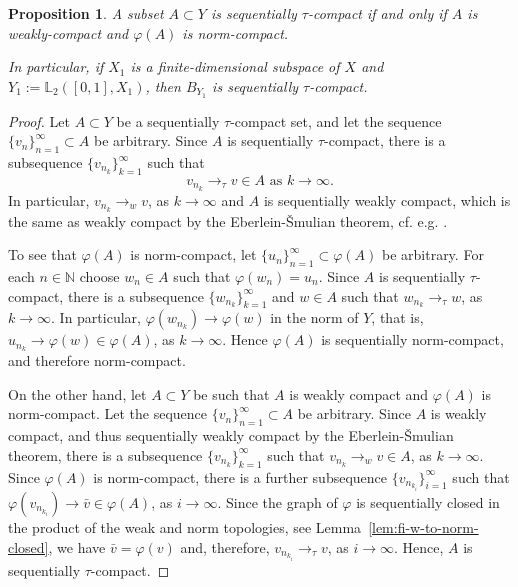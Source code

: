 \documentclass[12pt,leqno]{article}
\newtheorem{prop}[thm]{Proposition}   %
\theoremstyle{definition}
\theoremstyle{remark}
\def\N{\mathbb{N}}
\def\L{\mathbb{L}}
\begin{document}
    \begin{prop}\label{seq-tau-lsc}
        A subset $A\subset Y$ is sequentially $\tau$-compact if and only if $A$ is weakly-compact and $\varphi(A)$ is norm-compact.

        In particular, if $X_1$ is a finite-dimensional subspace of $X$ and
        $
            Y_1 := \L_2([0,1],X_1)$,
               then $B_{Y_1}$ is sequentially $\tau$-compact.
    \end{prop}
    \begin{proof}
        Let $A\subset Y$ be a sequentially $\tau$-compact set, and let the sequence $\{v_n\}_{n=1}^\infty\subset A$ be arbitrary. Since $A$ is sequentially  $\tau$-compact, there is a subsequence $\{v_{n_k}\}_{k=1}^\infty$ such that
        $$
             v_{n_k} \to_\tau v \in A\text{ as }k\to \infty.
        $$
        In particular, $v_{n_k} \to_w v$, as $k\to\infty$ and $A$ is sequentially weakly compact, which is the same as weakly compact by the Eberlein-\v{S}mulian theorem, cf. e.g. \cite[Theorem~3.28]{rudin_functional}.

        To see that $\varphi(A)$ is norm-compact, let $\{u_n\}_{n=1}^\infty \subset \varphi(A)$ be arbitrary. For each $n\in\N$ choose $w_n\in A$ such that $\varphi(w_n)=u_n$. Since $A$ is sequentially $\tau$-compact, there is a subsequence $\{w_{n_k}\}_{k=1}^\infty$ and $w\in A$ such that $w_{n_k}\to_\tau w$, as $k\to\infty$. In particular, $\varphi(w_{n_k}) \to \varphi(w)$ in the norm of $Y$, that is, $u_{n_k}\to \varphi(w)\in \varphi(A)$, as $k\to\infty$. Hence $\varphi(A)$ is sequentially norm-compact, and therefore norm-compact.

        On the other hand, let $A\subset Y$ be such that $A$ is weakly compact and $\varphi(A)$ is norm-compact. Let the sequence $\{v_n\}_{n=1}^\infty\subset A$ be arbitrary. Since $A$ is weakly compact, and thus sequentially weakly  compact by the Eberlein-\v{S}mulian theorem, there is a subsequence $\{v_{n_k}\}_{k=1}^\infty$ such that $v_{n_k} \to_w v \in A$, as $k\to\infty$. Since $\varphi(A)$ is norm-compact, there is a further subsequence $\{v_{n_{k_i}}\}_{i=1}^\infty$ such that $\varphi(v_{n_{k_i}}) \to \bar v \in \varphi(A)$, as $i\to\infty$. Since the graph of $\varphi$ is sequentially closed in the product of the weak and norm topologies, see Lemma~\ref{lem:fi-w-to-norm-closed}, we have $\bar v = \varphi(v)$ and, therefore, $v_{n_{k_i}} \to_\tau v$, as $i\to\infty$. Hence, $A$ is sequentially $\tau$-compact.


\end{proof}
\end{document}

